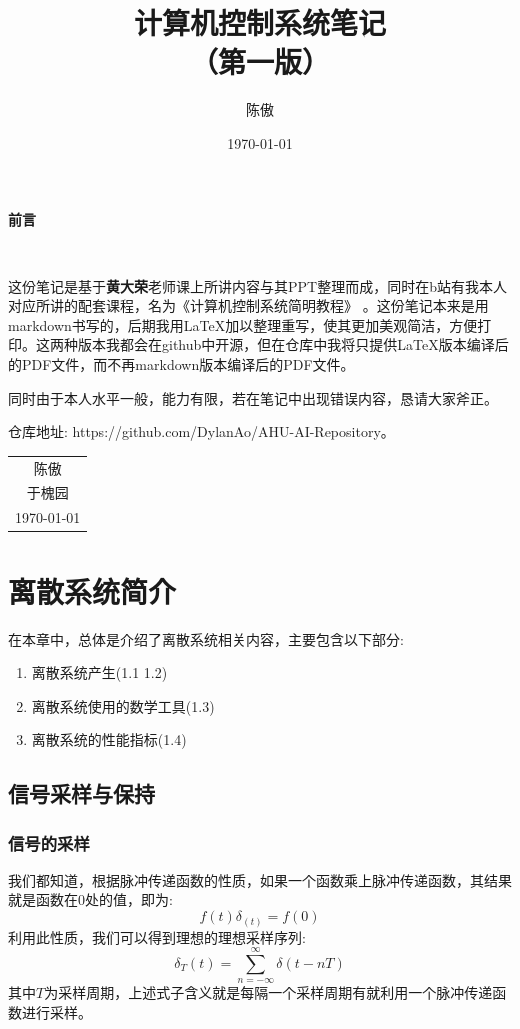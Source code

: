 \documentclass[12pt, a4paper, oneside]{ctexbook}
\title{{\Huge{\textbf{计算机控制系统笔记}}}\\
（第一版）}
\author{陈傲}
\date{\today}
\begin{document}
\maketitle

\setcounter{page}{1}

\begin{center}
    \Huge\textbf{前言}
\end{center}~\

这份笔记是基于\textbf{黄大荣}老师课上所讲内容与其PPT整理而成，同时在b站有我本人对应所讲的配套课程，名为《计算机控制系统简明教程》 。这份笔记本来是用markdown书写的，后期我用\LaTeX 加以整理重写，使其更加美观简洁，方便打印。这两种版本我都会在github中开源，但在仓库中我将只提供\LaTeX 版本编译后的PDF文件，而不再markdown版本编译后的PDF文件。

同时由于本人水平一般，能力有限，若在笔记中出现错误内容，恳请大家斧正。

仓库地址:
https://github.com/DylanAo/AHU-AI-Repository。
~\\
\begin{flushright}
    \begin{tabular}{c}
        陈傲\\
        于槐园\\
        \today
    \end{tabular}
\end{flushright}

\newpage
{}
\setcounter{page}{1}
\tableofcontents
\newpage
\setcounter{page}{1}

\chapter{离散系统简介}

在本章中，总体是介绍了离散系统相关内容，主要包含以下部分:
\begin{enumerate} 
	\item 离散系统产生(1.1 1.2)
	\item 离散系统使用的数学工具(1.3)
	\item 离散系统的性能指标(1.4)
\end{enumerate}
\newpage 
\section{信号采样与保持}

\subsection{信号的采样}
我们都知道，根据脉冲传递函数的性质，如果一个函数乘上脉冲传递函数，其结果就是函数在0处的值，即为:
$$
f(t)\delta_(t)=f(0)
$$
利用此性质，我们可以得到理想的理想采样序列:
$$
\delta_T(t)=\sum_{n=-\infty}^{\infty}\delta(t-nT)
$$
其中$T$为采样周期，上述式子含义就是每隔一个采样周期有就利用一个脉冲传递函数进行采样。
\end{document}

